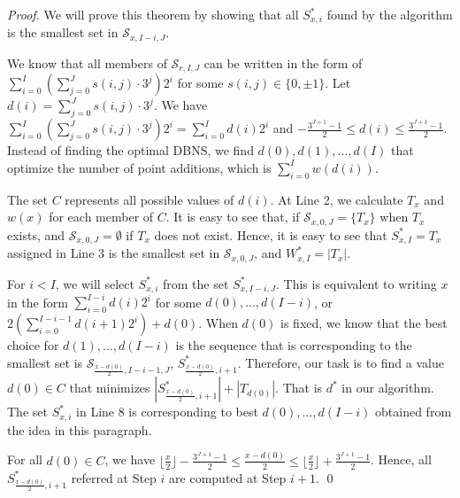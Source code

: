 \begin{proof}
We will prove this theorem by showing that all $S^*_{x,i}$ found by the algorithm is the smallest set in $\mathcal{S}_{x, I - i, J}$.

We know that all members of $\mathcal{S}_{r, I, J}$ can be written in the form of $\sum\limits_{i = 0}^I \left(\sum\limits_{j = 0}^J s(i,j) \cdot 3^j\right) 2^i$ for some $s(i,j) \in \{0, \pm 1\}$. Let $d(i) = \sum\limits_{j = 0}^J s(i,j) \cdot 3^j$. We have $\sum\limits_{i = 0}^I \left(\sum\limits_{j = 0}^J s(i,j) \cdot 3^j\right) 2^i = \sum\limits_{i = 0}^I d(i) 2^i$ and  $-\frac{3^{J + 1} - 1}{2} \leq d(i) \leq \frac{3^{J + 1} - 1}{2}$. Instead of finding the optimal DBNS, we find $d(0), d(1), \dots, d(I)$ that optimize the number of point additions, which is $\sum_{i = 0}^I w(d(i))$.

The set $C$ represents all possible values of $d(i)$. At Line 2, we calculate $T_x$ and $w(x)$ for each member of $C$. It is easy to see that, if $\mathcal{S}_{x, 0, J} = \{T_x\}$ when $T_x$ exists, and $\mathcal{S}_{x, 0, J} = \emptyset$ if $T_x$ does not exist. Hence, it is easy to see that $S_{x, I}^* = T_x$ assigned in Line 3 is the smallest set in $\mathcal{S}_{x, 0, J}$, and $W_{x, I}^* = |T_x|$.

For $i < I$, we will select $S^*_{x,i}$ from the set $S^*_{x, I - i, J}$. This is equivalent to writing $x$ in the form $\sum_{i = 0}^{I - i} d(i) 2^i$ for some $d(0), \dots, d(I - i)$, or $2 \left( \sum_{i = 0}^{I - i - 1} d(i + 1) 2^i \right) + d(0)$. When $d(0)$ is fixed, we know that the best choice for $d(1), \dots, d(I - i)$ is the sequence that is corresponding to the smallest set is $\mathcal{S}_{\frac{x - d(0)}{2}, I - i - 1, J}$, $S^*_{\frac{x - d(0)}{2}, i + 1}$. Therefore, our task is to find a value $d(0) \in C$ that minimizes $\left|S^*_{\frac{x - d(0)}{2}, i + 1}\right| + \left|T_{d(0)}\right|$. That is $d^*$ in our algorithm. The set $S^*_{x,i}$ in Line 8 is corresponding to best $d(0), \dots, d(I - i)$ obtained from the idea in this paragraph.

For all $d(0) \in C$, we have $\lfloor \frac{x}{2} \rfloor - \frac{3^{J + 1} - 1}{2} \leq \frac{x - d(0)}{2} \leq \lfloor \frac{x}{2} \rfloor + \frac{3^{J + 1} - 1}{2}$. Hence, all $S^*_{\frac{x - d(0)}{2}, i + 1}$ referred at Step $i$ are computed at Step $i + 1$. \qed
\end{proof}  


